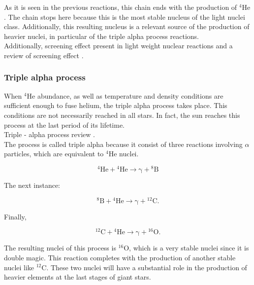 \documentclass[openany]{book}
\begin{document}
As it is seen in the previous reactions, this chain ends with the production of $\mathrm{{}^{4}He}$. The chain stops here because this is the most stable nucleus of the light nuclei class. Additionally, this resulting nucleus is a relevant source of the production of heavier nuclei, in particular of the triple alpha process reactions. \\

Additionally, screening effect present in light weight nuclear reactions \cite{raiola_migliardi_gyurky_aliotta_formicola_bonetti_broggini_campajola_corvisiero_costantini_et_2002} and a review of screening effect \cite{assenbaum_langanke_rolfs_1987}.

\subsubsection{Triple alpha process}

When $\mathrm{{}^{4}He}$ abundance, as well as temperature and density conditions are sufficient enough to fuse helium, the triple alpha process takes place. This conditions are not necessarily reached in all stars. In fact, the sun reaches this process at the last period of its lifetime.   \\

Triple - alpha process review \cite{coc_2012}. \\

The process is called triple alpha because it consist of three reactions involving $\alpha$ particles, which are equivalent to  $\mathrm{{}^{4}He}$ nuclei. 

\begin{equation}\label{eq:reaction_tripleAlpha_1}
	\mathrm{{}^{4}He + {}^{4}He \rightarrow  \gamma  + {}^{8}B }
\end{equation}

The next instance:

\begin{equation}\label{eq:reaction_tripleAlpha_2}
	\mathrm{{}^{8}B+ {}^{4}He \rightarrow  \gamma + {}^{12}C}. 
\end{equation}

Finally, 

\begin{equation}\label{eq:reaction_tripleAlpha_3}
	\mathrm{{}^{12}C + {}^{4}He \rightarrow \gamma + {}^{16}O}.
\end{equation}

The resulting nuclei of this process is $\mathrm{{}^{16}O}$, which is a very stable nuclei since it is double magic. This reaction completes with the production of another stable nuclei like $\mathrm{{}^{12}C}$. These two nuclei will have a substantial role in the production of heavier elements at the last stages of giant stars.
\end{document}
